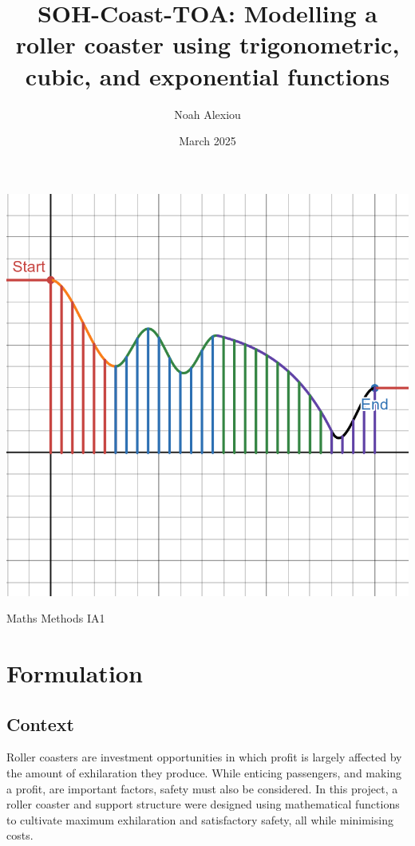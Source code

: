 \documentclass[11pt, letterpaper]{article}
\begin{document}
\begin{titlepage}
	\title{SOH-Coast-TOA: Modelling a roller coaster using trigonometric, cubic, and exponential functions}
	
	\author{Noah Alexiou}


	\date{March 2025}
	
	\maketitle
	\centering
	\includegraphics[width=1\linewidth]{finalgraph.png}
\begin{center}
	\large
	\vfill
	Maths Methods IA1
\end{center}
	
\end{titlepage}


\newpage
\tableofcontents


\newpage


\section{Formulation}
\subsection{Context}
Roller coasters are investment opportunities in which profit is largely affected by the amount of exhilaration they produce. While enticing passengers, and making a profit, are important factors, safety must also be considered. 
In this project, a roller coaster and support structure were designed using mathematical functions to cultivate maximum exhilaration and satisfactory safety, all while minimising costs.
\end{document}
